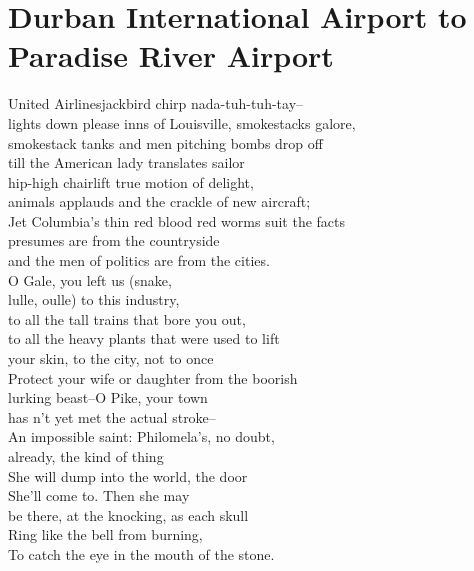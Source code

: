 \documentclass[smalldemyvopaper,11pt,twoside,onecolumn,openright,extrafontsizes]{memoir}
\newlength\drop
\begin{document}
\chapter{Durban International Airport to Paradise River Airport}
United Airlinesjackbird chirp nada-tuh-tuh-tay--
\\lights down please inns of Louisville, smokestacks galore,
\\smokestack tanks and men pitching bombs drop off
\\till the American lady translates sailor
\\hip-high chairlift true motion of delight,
\\animals applauds and the crackle of new aircraft;
\\Jet Columbia's thin red blood red worms suit the facts
\\presumes are from the countryside
\\and the men of politics are from the cities.
\\O Gale, you left us (snake,
\\lulle, oulle) to this industry,
\\to all the tall trains that bore you out,
\\to all the heavy plants that were used to lift
\\your skin, to the city, not to once
\\Protect your wife or daughter from the boorish
\\lurking beast--O Pike, your town
\\has n't yet met the actual stroke--
\\An impossible saint: Philomela's, no doubt,
\\already, the kind of thing
\\She will dump into the world, the door
\\She'll come to. Then she may
\\be there, at the knocking, as each skull
\\Ring like the bell from burning,
\\To catch the eye in the mouth of the stone.
\end{document}
